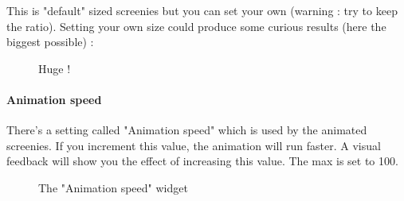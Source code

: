 \documentclass[10pt]{report}
\begin{document}
This is "default" sized screenies but you can set your own (warning : try to keep the ratio).\newline
Setting your own size could produce some curious results (here the biggest possible) :\newline
\begin{figure}[H]
\centering
{}
\caption{Huge !}
\end{figure}

\paragraph{Animation speed}

There's a setting called "Animation speed" which is used by the animated screenies.\newline
If you increment this value, the animation will run faster.\newline
A visual feedback will show you the effect of increasing this value.\newline
The max is set to 100.\newline
\begin{figure}[H]
\centering
{}
\caption{The "Animation speed" widget}
\end{figure}
\end{document}
